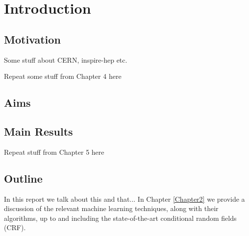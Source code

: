 
\chapter{Introduction} %

\label{Chapter1} %



\section{Motivation}

Some stuff about CERN, inspire-hep etc.

Repeat some stuff from Chapter 4 here

\section{Aims}


\section{Main Results}

Repeat stuff from Chapter 5 here

\section{Outline}

In this report we talk about this and that... In Chapter \ref{Chapter2} we provide a discussion of the relevant machine learning techniques, along with their algorithms, up to and including the state-of-the-art conditional random fields (CRF).